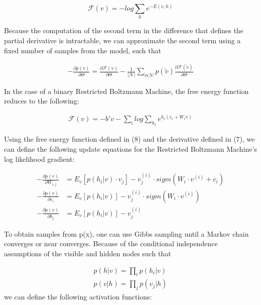 \documentclass[journal]{IEEEtran}
\begin{document}
\begin{equation}
\mathcal{F}(v) = -log \sum\limits_{h}e^{-E(v,h)}
\end{equation}

Because the computation of the second term in the difference that defines the partial derivative is intractable, we can approximate the second term using a fixed number of samples from the model, such that 

\begin{equation}
\begin{aligned}
- \frac{\partial p(v)}{\partial \Theta} = \frac{\partial \mathcal{F}(v)}{\partial \Theta} -\frac{1}{|\mathcal{N}|} \sum\limits_{\tilde{v} \epsilon \mathcal{N}} p(\tilde{v}) \frac{\partial \mathcal{F}(\tilde{v})}{\partial \Theta}
\end{aligned}
\end{equation}

In the case of a binary Restricted Boltzmann Machine, the free energy function reduces to the following:

\begin{equation}
\begin{aligned}
\mathcal{F}(v) = -b'v - \sum\limits_{i}log\sum\limits_{h_{i}}e^{h_{i}(c_{i}+W_{i}v)}
\end{aligned}
\end{equation}

Using the free energy function defined in (8) and the derivative defined in (7), we can define the following update equations for the Restricted Boltzmann Machine's log likelihood gradient:

\begin{equation}
\begin{aligned}
- \frac{\partial p(v)}{\partial W_{i,j}} &= E_{v}[p(h_{i}|v)\cdot v_{j}] - v_{j}^{(i)}\cdot sigm(W_{i} \cdot v^{(i)} + c_{i})\\
- \frac{\partial p(v)}{\partial c_{i}} &= E_{v}[p(h_{i}|v)] - v_{j}^{(i)}\cdot sigm(W_{i} \cdot v^{(i)})\\
- \frac{\partial p(v)}{\partial b_{j}} &= E_{v}[p(h_{i}|v)] - v_{j}^{(i)}
\end{aligned}
\end{equation}

To obtain samples from p(x), one can use Gibbs sampling until a Markov chain converges or near converges.  Because of the conditional independence assumptions of the visible and hidden nodes such that 

\begin{equation}
\begin{aligned}
p(h|v) = \prod\limits_{i} p(h_{i}|v)\\
p(v|h) = \prod\limits_{j} p(v_{j}|h)
\end{aligned}
\end{equation} we can define the following activation functions:
\end{document}
